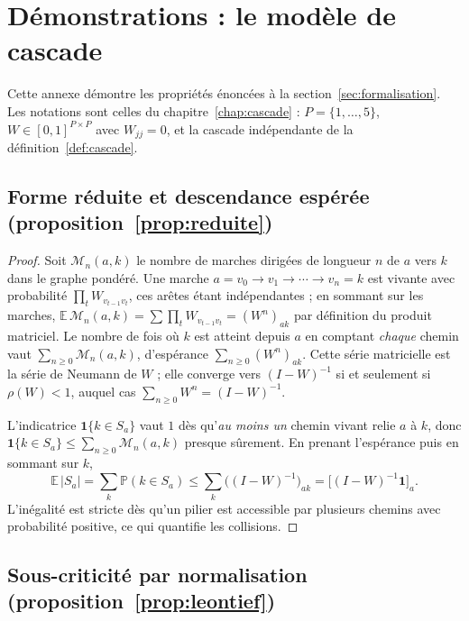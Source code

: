\chapter{Démonstrations : le modèle de cascade}
\label{ann:cascade}


Cette annexe démontre les propriétés énoncées à la section~\ref{sec:formalisation}. Les
notations sont celles du chapitre~\ref{chap:cascade} : $P=\{1,\dots,5\}$, $W\in[0,1]^{P\times P}$
avec $W_{jj}=0$, et la cascade indépendante de la définition~\ref{def:cascade}.

\section*{Forme réduite et descendance espérée (proposition~\ref{prop:reduite})}

\begin{proof}
Soit $\mathcal M_n(a,k)$ le nombre de marches dirigées de longueur $n$ de $a$ vers $k$ dans le
graphe pondéré. Une marche $a=v_0\to v_1\to\cdots\to v_n=k$ est vivante avec probabilité
$\prod_{t} W_{v_{t-1}v_t}$, ces arêtes étant indépendantes ; en sommant sur les marches,
$\mathbb E\,\mathcal M_n(a,k)=\sum \prod_t W_{v_{t-1}v_t}=(W^n)_{ak}$ par définition du produit
matriciel. Le nombre de fois où $k$ est atteint depuis $a$ en comptant \emph{chaque} chemin
vaut $\sum_{n\ge0}\mathcal M_n(a,k)$, d'espérance $\sum_{n\ge0}(W^n)_{ak}$. Cette série
matricielle est la série de Neumann de $W$ ; elle converge vers $(I-W)^{-1}$ si et seulement si
$\rho(W)<1$, auquel cas $\sum_{n\ge0}W^n=(I-W)^{-1}$.

L'indicatrice $\mathbf 1\{k\in S_a\}$ vaut $1$ dès qu'\emph{au moins un} chemin vivant relie
$a$ à $k$, donc $\mathbf 1\{k\in S_a\}\le \sum_{n\ge0}\mathcal M_n(a,k)$ presque sûrement. En
prenant l'espérance puis en sommant sur $k$,
\[
  \mathbb E\,|S_a|=\sum_k \mathbb P(k\in S_a)\le \sum_k\bigl((I-W)^{-1}\bigr)_{ak}
  =\bigl[(I-W)^{-1}\mathbf 1\bigr]_a .
\]
L'inégalité est stricte dès qu'un pilier est accessible par plusieurs chemins avec probabilité
positive, ce qui quantifie les collisions.
\end{proof}

\section*{Sous-criticité par normalisation (proposition~\ref{prop:leontief})}

